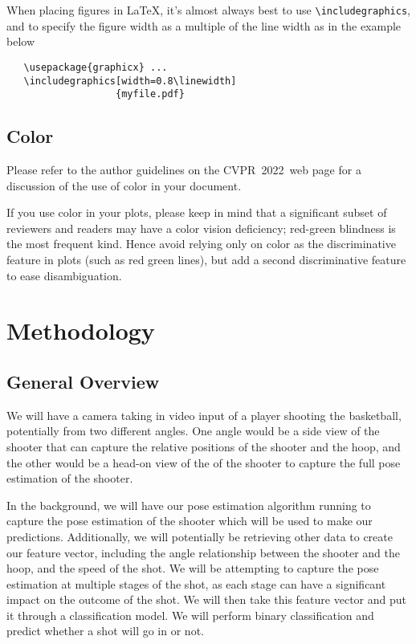 \documentclass[10pt,twocolumn,letterpaper]{article}
\def\confName{CVPR}
\def\confYear{2022}
\begin{document}
When placing figures in \LaTeX, it's almost always best to use \verb+\includegraphics+, and to specify the figure width as a multiple of the line width as in the example below
{\small\begin{verbatim}
   \usepackage{graphicx} ...
   \includegraphics[width=0.8\linewidth]
                   {myfile.pdf}
\end{verbatim}
}


\subsection{Color}

Please refer to the author guidelines on the \confName\ \confYear\ web page for a discussion of the use of color in your document.

If you use color in your plots, please keep in mind that a significant subset of reviewers and readers may have a color vision deficiency; red-green blindness is the most frequent kind.
Hence avoid relying only on color as the discriminative feature in plots (such as red \vs green lines), but add a second discriminative feature to ease disambiguation.

\section{Methodology}
\subsection{General Overview}
We will have a camera taking in video input of a player shooting the basketball, potentially from two different angles.
One angle would be a side view of the shooter that can capture the relative positions of the shooter and the hoop, and the other
would be a head-on view of the of the shooter to capture the full pose estimation of the shooter.

In the background, we will have our pose estimation algorithm running to capture the pose estimation of the shooter which will be used
to make our predictions. Additionally, we will potentially be retrieving other data to create our feature vector, including the angle relationship
between the shooter and the hoop, and the speed of the shot. We will be attempting to capture the pose estimation at multiple stages of the
shot, as each stage can have a significant impact on the outcome of the shot. We will then take this feature vector and put it through a classification model.
We will perform binary classification and predict whether a shot will go in or not.
\end{document}
